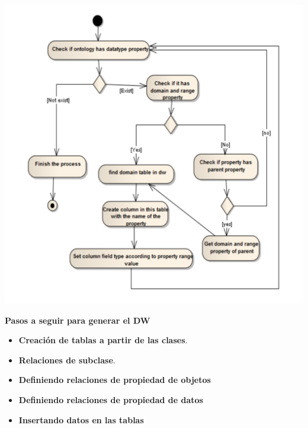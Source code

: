 \documentclass{fancyslides}
\begin{document}
\begin{frame}
\misc

\begin{center}
\includegraphics[scale=0.15]{data_property}
\end{center}
\end{frame}


\begin{frame}
\misc
{ \textbf{\Large Pasos a seguir para generar el DW}
\newline
\newline

\begin{itemize}
  \item \textbf{Creación de tablas a partir de las clases}.
  \item \textbf{Relaciones de subclase}.
  \item \textbf{Definiendo relaciones de propiedad de objetos}
  \item \textbf{Definiendo relaciones de propiedad de datos}
  \item \textbf{Insertando datos en las tablas}
\end{itemize}

}
\end{frame}
\end{document}
